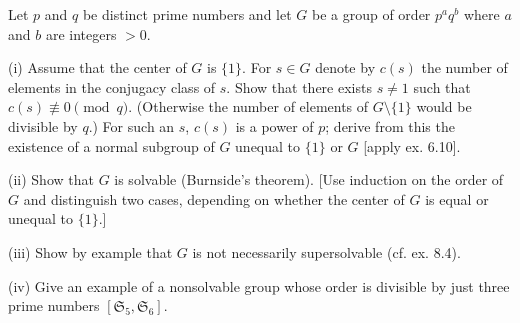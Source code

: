 Let $p$ and $q$ be distinct prime numbers and let $G$ be a group of order $p^a q^b$ where $a$ and $b$ are integers $> 0$.

(i) Assume that the center of $G$ is $\{1\}$. For $s \in G$ denote by $c(s)$ the number of elements in the conjugacy class of $s$. Show that there exists $s \neq 1$ such that $c(s) \not\equiv 0 \pmod{q}$. (Otherwise the number of elements of $G \setminus \{1\}$ would be divisible by $q$.) For such an $s$, $c(s)$ is a power of $p$; derive from this the existence of a normal subgroup of $G$ unequal to $\{1\}$ or $G$ [apply ex. 6.10].

(ii) Show that $G$ is solvable (Burnside's theorem). [Use induction on the order of $G$ and distinguish two cases, depending on whether the center of $G$ is equal or unequal to $\{1\}$.]

(iii) Show by example that $G$ is not necessarily supersolvable (cf. ex. 8.4).

(iv) Give an example of a nonsolvable group whose order is divisible by just three prime numbers $[\mathfrak{S}_5, \mathfrak{S}_6]$.
